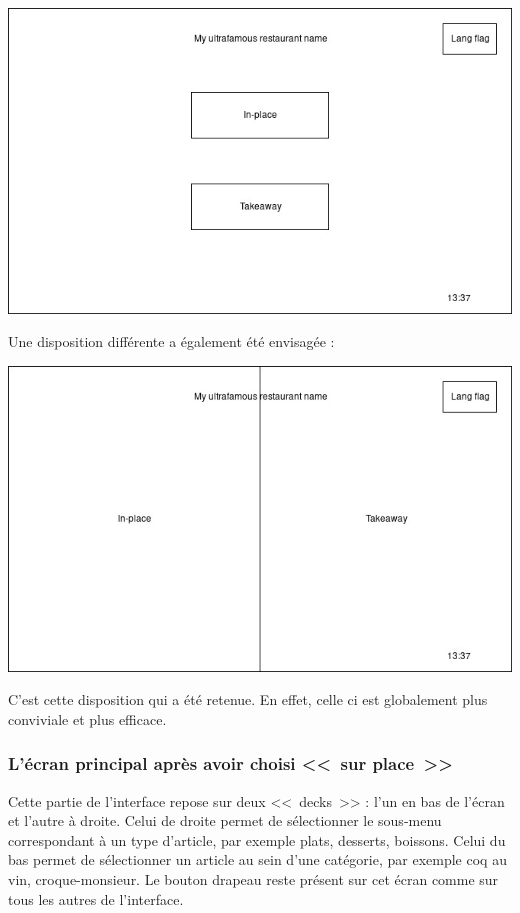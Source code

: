 \documentclass[a4paper,12pt]{article}
\begin{document}
\begin{center}
	\includegraphics[width=\textwidth]{intro_screen.jpg}
\end{center}

Une disposition différente a également été envisagée :

\begin{center}
	\includegraphics[width=\textwidth]{alt_intro_screen.jpg}
\end{center}

C'est cette disposition qui a été retenue. En effet, celle ci est globalement plus conviviale et plus efficace.

\subsubsection{L'écran principal après avoir choisi <<~sur place~>>}

Cette partie de l'interface repose sur deux <<~decks~>> : l'un en bas de l'écran et l'autre à droite. Celui de droite
permet de sélectionner le sous-menu correspondant à un type d'article, par exemple plats, desserts, boissons. Celui
du bas permet de sélectionner un article au sein d'une catégorie, par exemple coq au vin, croque-monsieur. Le bouton
drapeau reste présent sur cet écran comme sur tous les autres de l'interface.
\end{document}
